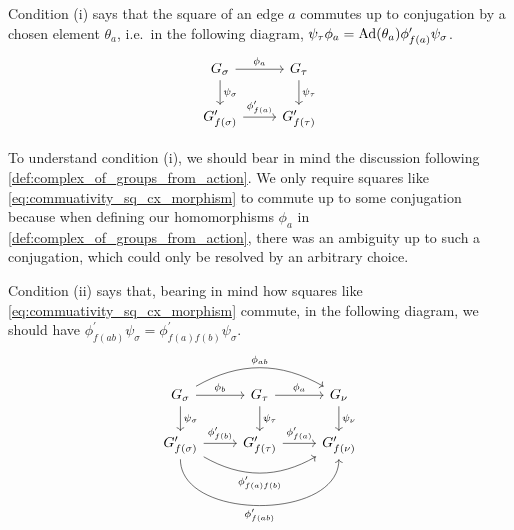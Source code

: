 Condition (i) says that the square of an edge $a$ commutes up to conjugation by a chosen element $\theta_a$, i.e.~in the following diagram, $\psi_\tau \phi_a = \operatorname{Ad}(\theta_a) \phi^\prime_{f(a)} \psi_\sigma$.
\begin{equation}
	\begin{tikzcd}
		G_\sigma \ar[d, "\psi_\sigma"] \ar[r, "\phi_a"] & G_\tau \ar[d, "\psi_\tau"]\\
		G^\prime_{f(\sigma)} \ar[r, "\phi^\prime_{f(a)}"] & G^\prime_{f(\tau)}
	\end{tikzcd}
	\label{eq:commuativity_sq_cx_morphism}
\end{equation}


To understand condition (i), we should bear in mind the discussion following \cref{def:complex_of_groups_from_action}.
We only require squares like \eqref{eq:commuativity_sq_cx_morphism} to commute up to some conjugation because when defining our homomorphisms $\phi_a$ in \cref{def:complex_of_groups_from_action}, there was an ambiguity up to such a conjugation, which could only be resolved by an arbitrary choice.

Condition (ii) says that, bearing in mind how squares like \eqref{eq:commuativity_sq_cx_morphism} commute, in the following diagram, we should have $\phi^\prime_{f(ab)}\psi_\sigma  = \phi^\prime_{f(a)f(b)}\psi_\sigma$.
\begin{equation}
	\begin{tikzcd}
		G_\sigma \ar[d, "\psi_\sigma"] \ar[r, "\phi_b"] \ar[rr, bend left, "\phi_{ab}"] & G_\tau \ar[d, "\psi_\tau"] \ar[r, "\phi_a"] & G_\nu \ar[d, "\psi_\nu"]\\
		G^\prime_{f(\sigma)} \ar[rr, bend right, "\phi^\prime_{f(a)f(b)}"'] \ar[rr, bend right=90, "\phi^\prime_{f(ab)}"'] \ar[r, "\phi^\prime_{f(b)}"] & G^\prime_{f(\tau)} \ar[r, "\phi^\prime_{f(a)}"] & G^\prime_{f(\nu)}
	\end{tikzcd}
	\label{eq:commutativity_double_sq_cx_morphism}
\end{equation}

